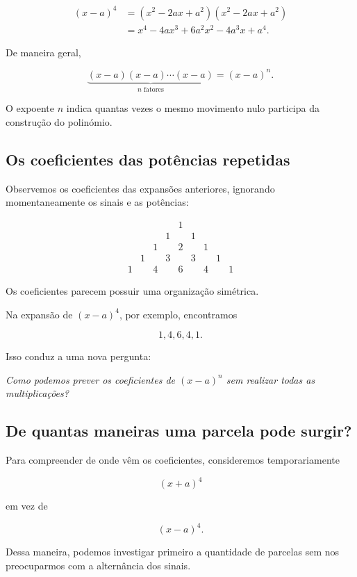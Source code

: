 \documentclass[12pt,a4paper]{article}
\begin{document}
\[
\begin{aligned}
(x-a)^4
&=(x^2-2ax+a^2)(x^2-2ax+a^2)\\
&=x^4-4ax^3+6a^2x^2-4a^3x+a^4.
\end{aligned}
\]

De maneira geral,

\[
\underbrace{(x-a)(x-a)\cdots(x-a)}
_{n\text{ fatores}}
=
(x-a)^n.
\]

O expoente \(n\) indica quantas vezes o mesmo movimento nulo participa
da construção do polinómio.

\subsection{Os coeficientes das potências repetidas}

Observemos os coeficientes das expansões anteriores, ignorando
momentaneamente os sinais e as potências:

\[
\begin{array}{ccccccccc}
&&&&1\\[4pt]
&&&1&&1\\[4pt]
&&1&&2&&1\\[4pt]
&1&&3&&3&&1\\[4pt]
1&&4&&6&&4&&1
\end{array}
\]

Os coeficientes parecem possuir uma organização simétrica.

Na expansão de \((x-a)^4\), por exemplo, encontramos

\[
1,4,6,4,1.
\]

Isso conduz a uma nova pergunta:

\begin{center}
\emph{Como podemos prever os coeficientes de \((x-a)^n\) sem realizar
todas as multiplicações?}
\end{center}

\subsection{De quantas maneiras uma parcela pode surgir?}

Para compreender de onde vêm os coeficientes, consideremos
temporariamente

\[
(x+a)^4
\]

em vez de

\[
(x-a)^4.
\]

Dessa maneira, podemos investigar primeiro a quantidade de parcelas sem
nos preocuparmos com a alternância dos sinais.
\end{document}
